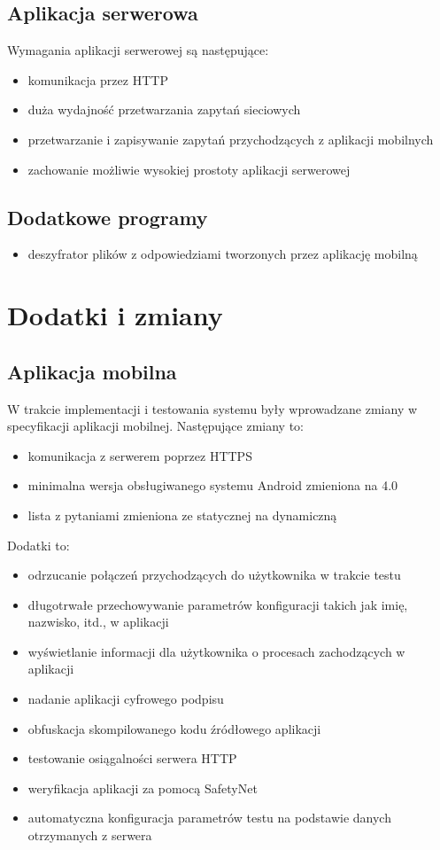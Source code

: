 \documentclass[eng]{mgr}
\begin{document}
			\subsection{Aplikacja serwerowa}
			Wymagania aplikacji serwerowej są następujące:
			\begin{itemize}
				\item komunikacja przez HTTP
				\item duża wydajność przetwarzania zapytań sieciowych
				\item przetwarzanie i zapisywanie zapytań przychodzących z aplikacji mobilnych
				\item zachowanie możliwie wysokiej prostoty aplikacji serwerowej
			\end{itemize}
		
			\subsection{Dodatkowe programy}
			\begin{itemize}
				\item deszyfrator plików z odpowiedziami tworzonych przez aplikację mobilną
			\end{itemize}
		
		\section{Dodatki i zmiany}
		
			\subsection{Aplikacja mobilna}
			W trakcie implementacji i testowania systemu były wprowadzane zmiany w specyfikacji aplikacji mobilnej. Następujące zmiany to:
			\begin{itemize}
				\item komunikacja z serwerem poprzez HTTPS
				\item minimalna wersja obsługiwanego systemu Android zmieniona na 4.0
				\item lista z pytaniami zmieniona ze statycznej na dynamiczną
			\end{itemize}
			Dodatki to:
			\begin{itemize}
				\item odrzucanie połączeń przychodzących do użytkownika w trakcie testu
				\item długotrwałe przechowywanie parametrów konfiguracji takich jak imię, nazwisko, itd., w aplikacji
				\item wyświetlanie informacji dla użytkownika o procesach zachodzących w aplikacji
				\item nadanie aplikacji cyfrowego podpisu
				\item obfuskacja skompilowanego kodu źródłowego aplikacji
				\item testowanie osiągalności serwera HTTP
				\item weryfikacja aplikacji za pomocą SafetyNet
				\item automatyczna konfiguracja parametrów testu na podstawie danych otrzymanych z serwera
			\end{itemize}
		
\end{document}
